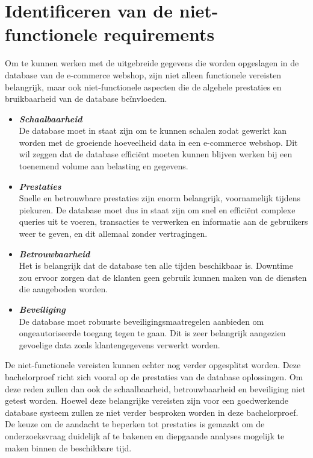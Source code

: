 \section{Identificeren van de niet-functionele requirements}
\label{sec:niet-functionele-requirements}
Om te kunnen werken met de uitgebreide gegevens die worden opgeslagen in de database van de e-commerce webshop, zijn niet alleen functionele vereisten belangrijk, maar ook niet-functionele aspecten die de algehele prestaties en bruikbaarheid van de database beïnvloeden.
\begin{itemize}
    \item \textbf{\textit{Schaalbaarheid}} \\
    De database moet in staat zijn om te kunnen schalen zodat gewerkt kan worden met de groeiende hoeveelheid data in een e-commerce webshop. Dit wil zeggen dat de database efficiënt moeten kunnen blijven werken bij een toenemend volume aan belasting en gegevens. 
    
    \item \textbf{\textit{Prestaties}} \\
    Snelle en betrouwbare prestaties zijn enorm belangrijk, voornamelijk tijdens piekuren. De database moet dus in staat zijn om snel en efficiënt complexe queries uit te voeren, transacties te verwerken en informatie aan de gebruikers weer te geven, en dit allemaal zonder vertragingen.
    
    \item \textbf{\textit{Betrouwbaarheid}} \\
    Het is belangrijk dat de database ten alle tijden beschikbaar is. Downtime zou ervoor zorgen dat de klanten geen gebruik kunnen maken van de diensten die aangeboden worden.
    
    \item \textbf{\textit{Beveiliging}} \\
    De database moet robuuste beveiligingsmaatregelen aanbieden om ongeautoriseerde toegang tegen te gaan. Dit is zeer belangrijk aangezien gevoelige data zoals klantengegevens verwerkt worden.
\end{itemize}

De niet-functionele vereisten kunnen echter nog verder opgesplitst worden. Deze bachelorproef richt zich vooral op de prestaties van de database oplossingen. Om deze reden zullen dan ook de schaalbaarheid, betrouwbaarheid en beveiliging niet getest worden. Hoewel deze belangrijke vereisten zijn voor een goedwerkende database systeem zullen ze niet verder besproken worden in deze bachelorproef. De keuze om de aandacht te beperken tot prestaties is gemaakt om de onderzoeksvraag duidelijk af te bakenen en diepgaande analyses mogelijk te maken binnen de beschikbare tijd.

